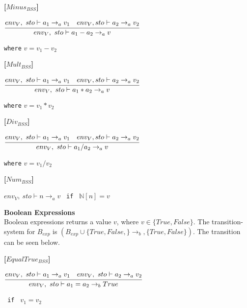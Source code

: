 \textbf{[$Minus_{BSS}$]}\\
\begin{center}
	\begin{math}
	\cfrac
		{env_V,\ sto \vdash a_1 \rightarrow_a v_1 \quad env_V, sto \vdash a_2 \rightarrow_a v_2}
		{env_V,\ sto \vdash a_1 - a_2 \rightarrow_a v}
	\end{math}
	
	
	\texttt{where} $v = v_1 - v_2$
\end{center}

\textbf{[$Mult_{BSS}$]}\\
\begin{center}
	\begin{math}
	\cfrac
	{env_V,\ sto \vdash a_1 \rightarrow_a v_1 \quad env_V, sto \vdash a_2 \rightarrow_a v_2}
	{env_V,\ sto \vdash a_1 * a_2 \rightarrow_a v}
	\end{math}
	
	
	\texttt{where} $v = v_1 * v_2$
\end{center}

\textbf{[$Div_{BSS}$]}\\
\begin{center}
	\begin{math}
	\cfrac
	{env_V,\ sto \vdash a_1 \rightarrow_a v_1 \quad env_V, sto \vdash a_2 \rightarrow_a v_2}
	{env_V,\ sto \vdash a_1 / a_2 \rightarrow_a v}
	\end{math}
	
	
	\texttt{where} $v = v_1 / v_2$
\end{center}

\textbf{[$Num_{BSS}$]}\\
\begin{center}
	\begin{math}
		env_V,\ sto \vdash n \rightarrow_a v
	\end{math}
	\texttt{ if } $\mathbb{N}[n] = v$
\end{center}

\textbf{\large{Boolean Expressions}}\\
Boolean expressions returns a value $v$, where $v \in \{True, False\}$.
The transition-system for $B_{exp}$ is $(B_{exp} \cup \{True, False,\} \rightarrow_b, \{True, False\})$.
The transition can be seen below.

\textbf{[$EqualTrue_{BSS}$]}\\
\begin{center}
	\begin{math}
		\cfrac
			{env_V,\ sto \vdash a_1 \rightarrow_a v_1 \quad env_V,\ sto \vdash a_2 \rightarrow_a v_2}
			{env_V,\ sto \vdash a_1 = a_2 \rightarrow_b True}
	\end{math}
	
	\texttt{ if } $v_1 = v_2$
\end{center}

